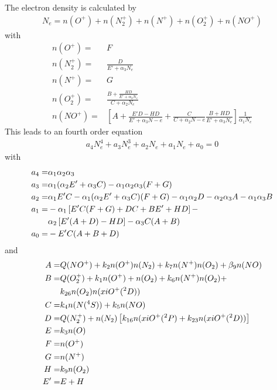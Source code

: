 The electron density is calculated by
%
\begin{align}
  N_e = n(O^+) + n(N_2^+) + n(N^+) + n(O_2^+)+ n(NO^+)
\end{align}
%
with
%
\begin{align}
  n(O^+) = & F \\
  n(N_2^+) = & \frac{D}{E' + \alpha_3 N_e} \\
  n(N^+) = & G \\
  n(O_2^+) = & \frac{B+\frac{HD}{E' + \alpha_3 N_e}}{C+ \alpha_2 N_e}
  \\
  n(NO^+) =&  \left[ A + \frac{E' D - HD}{E' + \alpha_3 N-e} + \frac{C}{C+ \alpha_2 N-e}
     \frac{B+HD}{E' + \alpha_3 N_e} \right] \frac{1}{\alpha_1 N_e}
\end{align}
%
 This leads to an
fourth order equation
%
\begin{align}
  a_4 N_e^4 + a_3 N_e^3 + a_2 N_e + a_1 N_e + a_0 = 0
\end{align}
%
with
%
\begin{align}
   a_4 = & \alpha_1 \alpha_2 \alpha_3 \\
   a_3 = & \alpha_1 (\alpha_2 E' + \alpha_3 C) - \alpha_1 \alpha_2
       \alpha_3 (F + G) \\
   a_2 = & \alpha_1 E' C - \alpha_1 (\alpha_2 E' + \alpha_3 C) (F+G)
        - \alpha_1 \alpha_2 D - \alpha_2 \alpha_3 A - \alpha_1
        \alpha_3 B \\
   a_1 = & - \alpha_1 \left[ E' C (F+G) + D C + B E' + H D\right] -
         \notag \\
        {} & \alpha_2 \left[ E' (A + D) - H D \right] - \alpha_3 C (A +
        B)\\
   a_0 =  & - E' C (A + B + D)
\end{align}
%
and
%
\begin{align}
  A = & Q(NO^+) + k_2 n(O^+)n(N_2) + k_7 n(N^+)n(O_2) + \beta_9
       n(NO)\\
  B = & Q(O_2^+)+ k_1 n(O^+)+ n(O_2) + k_6 n(N^+)n(O_2) + \notag \\
       {} & k_{26}n(O_2)n(xiO^+(^2D)) \\
  C = & k_4 n(N(^4S)) + k_5 n(NO) \\
  D = & Q(N_2^+) + n(N_2)\left[ k_{16}n(xiO^+(^2P) +
       k_{23}n(xiO^+(^2D))\right] \\
  E = & k_3 n(O) \\
  F = & n(O^+)  \\
  G = & n(N^+)  \\
  H = & k_9 n(O_2) \\
  E' = & E + H
\end{align}
